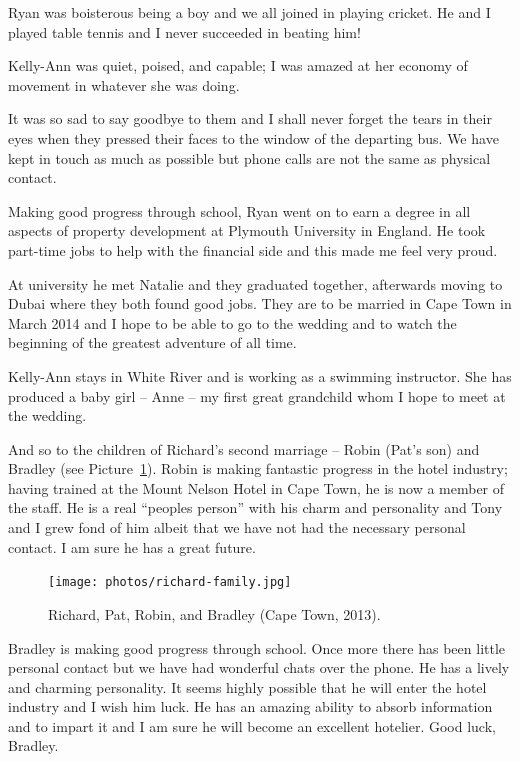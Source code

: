 Ryan was boisterous being a boy and we all joined in playing
cricket. He and I played table tennis and I never succeeded in beating
him!

Kelly-Ann was quiet, poised, and capable; I was amazed at her economy
of movement in whatever she was doing.

It was so sad to say goodbye to them and I shall never forget the
tears in their eyes when they pressed their faces to the window of the
departing bus. We have kept in touch as much as possible but phone
calls are not the same as physical contact.

Making good progress through school, Ryan went on to earn a degree in
all aspects of property development at Plymouth University in
England. He took part-time jobs to help with the financial side and
this made me feel very proud.

At university he met Natalie and they graduated together, afterwards
moving to Dubai where they both found good jobs. They are to be
married in Cape Town in March 2014 and I hope to be able to go to the
wedding and to watch the beginning of the greatest adventure of all
time.

Kelly-Ann stays in White River and is working as a swimming
instructor. She has produced a baby girl -- Anne -- my first great
grandchild whom I hope to meet at the wedding.

And so to the children of Richard's second marriage -- Robin (Pat's
son) and Bradley (see Picture~\ref{richard-family}). Robin is making
fantastic progress in the hotel industry; having trained at the Mount
Nelson Hotel in Cape Town, he is now a member of the staff. He is a
real ``peoples person'' with his charm and personality and Tony and I
grew fond of him albeit that we have not had the necessary personal
contact. I am sure he has a great future.

\begin{figure}
  \centering
  \texttt{[image: photos/richard-family.jpg]}
  \caption{Richard, Pat, Robin, and Bradley (Cape Town, 2013).}
  \label{richard-family}
\end{figure}

Bradley is making good progress through school. Once more there has
been little personal contact but we have had wonderful chats over the
phone. He has a lively and charming personality. It seems highly
possible that he will enter the hotel industry and I wish him luck.
He has an amazing ability to absorb information and to impart it and I
am sure he will become an excellent hotelier.  Good luck, Bradley.


